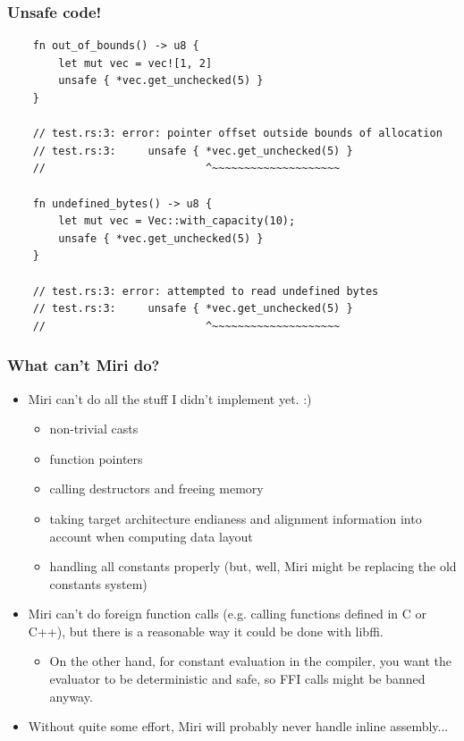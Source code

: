 \documentclass{beamer}
\begin{document}
\begin{frame}[fragile]
  \frametitle{Unsafe code!}
  \begin{verbatim}
    fn out_of_bounds() -> u8 {
        let mut vec = vec![1, 2]
        unsafe { *vec.get_unchecked(5) }
    }

    // test.rs:3: error: pointer offset outside bounds of allocation
    // test.rs:3:     unsafe { *vec.get_unchecked(5) }
    //                         ^~~~~~~~~~~~~~~~~~~~~

    fn undefined_bytes() -> u8 {
        let mut vec = Vec::with_capacity(10);
        unsafe { *vec.get_unchecked(5) }
    }

    // test.rs:3: error: attempted to read undefined bytes
    // test.rs:3:     unsafe { *vec.get_unchecked(5) }
    //                         ^~~~~~~~~~~~~~~~~~~~~
  \end{verbatim}
\end{frame}

\begin{frame}
  \frametitle{What can't Miri do?}
  \begin{itemize}
    \item Miri can't do all the stuff I didn't implement yet. :)
      \begin{itemize}
        \item non-trivial casts
        \item function pointers
        \item calling destructors and freeing memory
        \item taking target architecture endianess and alignment information
          into account when computing data layout
        \item handling all constants properly (but, well, Miri might be
          replacing the old constants system)
      \end{itemize}
      \pause

    \item Miri can't do foreign function calls (e.g. calling functions defined
      in C or C++), but there is a reasonable way it could be done with libffi.
      \begin{itemize}
        \item On the other hand, for constant evaluation in the compiler, you
          want the evaluator to be deterministic and safe, so FFI calls might be
          banned anyway.
      \end{itemize}
      \pause

    \item Without quite some effort, Miri will probably never handle inline
      assembly...
  \end{itemize}
\end{frame}
\end{document}
